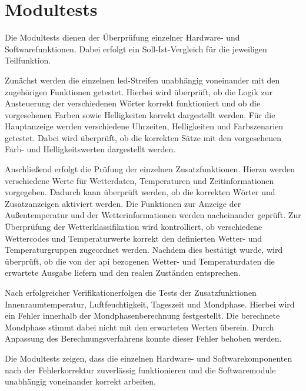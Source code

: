 \section{Modultests}
Die Modultests dienen der Überprüfung einzelner Hardware- und Softwarefunktionen.  
Dabei erfolgt ein Soll-Ist-Vergleich für die jeweiligen Teilfunktion.  

Zunächst werden die einzelnen \gls{led}-Streifen unabhängig voneinander mit den zugehörigen Funktionen getestet.  
Hierbei wird überprüft, ob die Logik zur Ansteuerung der verschiedenen Wörter korrekt funktioniert und ob die vorgesehenen Farben sowie Helligkeiten korrekt dargestellt werden.  
Für die Hauptanzeige werden verschiedene Uhrzeiten, Helligkeiten und Farbszenarien getestet.  
Dabei wird überprüft, ob die korrekten Sätze mit den vorgesehenen Farb- und Helligkeitswerten dargestellt werden.  

Anschließend erfolgt die Prüfung der einzelnen Zusatzfunktionen.  
Hierzu werden verschiedene Werte für Wetterdaten, Temperaturen und Zeitinformationen vorgegeben.  
Dadurch kann überprüft werden, ob die korrekten Wörter und Zusatzanzeigen aktiviert werden.  
Die Funktionen zur Anzeige der Außentemperatur und der Wetterinformationen werden nacheinander geprüft.  
Zur Überprüfung der Wetterklassifikation wird kontrolliert, ob verschiedene Wettercodes und Temperaturwerte korrekt den definierten Wetter- und Temperaturgruppen zugeordnet werden.  
Nachdem dies bestätigt wurde, wird überprüft, ob die von der \gls{api} bezogenen Wetter- und Temperaturdaten die erwartete Ausgabe liefern und den realen Zuständen entsprechen.  

Nach erfolgreicher Verifikationerfolgen die Tests der Zusatzfunktionen Innenraumtemperatur, Luftfeuchtigkeit, Tageszeit und Mondphase.  
Hierbei wird ein Fehler innerhalb der Mondphasenberechnung festgestellt.  
Die berechnete Mondphase stimmt dabei nicht mit den erwarteten Werten überein.  
Durch Anpassung des Berechnungsverfahrens konnte dieser Fehler behoben werden.  

Die Modultests zeigen, dass die einzelnen Hardware- und Softwarekomponenten nach der Fehlerkorrektur zuverlässig funktionieren und die Softwaremodule unabhängig voneinander korrekt arbeiten.  